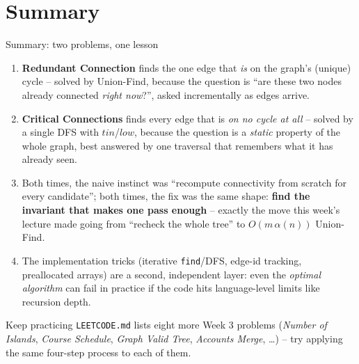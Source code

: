 \documentclass[11pt,aspectratio=169]{beamer}
\begin{document}
\section{Summary}

\begin{frame}{Summary: two problems, one lesson}
  \footnotesize
  \begin{enumerate}
    \item \textbf{Redundant Connection} finds the one edge that \emph{is} on the graph's
    (unique) cycle -- solved by Union-Find, because the question is ``are these two
    nodes already connected \emph{right now}?'', asked incrementally as edges arrive.
    \item \textbf{Critical Connections} finds every edge that is \emph{on no cycle at
    all} -- solved by a single DFS with $tin$/$low$, because the question is a
    \emph{static} property of the whole graph, best answered by one traversal that
    remembers what it has already seen.
    \item Both times, the naive instinct was ``recompute connectivity from scratch for
    every candidate''; both times, the fix was the same shape: \textbf{find the
    invariant that makes one pass enough} -- exactly the move this week's lecture made
    going from ``recheck the whole tree'' to $O(m\,\alpha(n))$ Union-Find.
    \item The implementation tricks (iterative \texttt{find}/DFS, edge-id tracking,
    preallocated arrays) are a second, independent layer: even the \emph{optimal
    algorithm} can fail in practice if the code hits language-level limits like
    recursion depth.
  \end{enumerate}
  \begin{alertblock}{Keep practicing}
    \texttt{LEETCODE.md} lists eight more Week 3 problems (\emph{Number of Islands},
    \emph{Course Schedule}, \emph{Graph Valid Tree}, \emph{Accounts Merge}, \dots) --
    try applying the same four-step process to each of them.
  \end{alertblock}
\end{frame}
\end{document}

